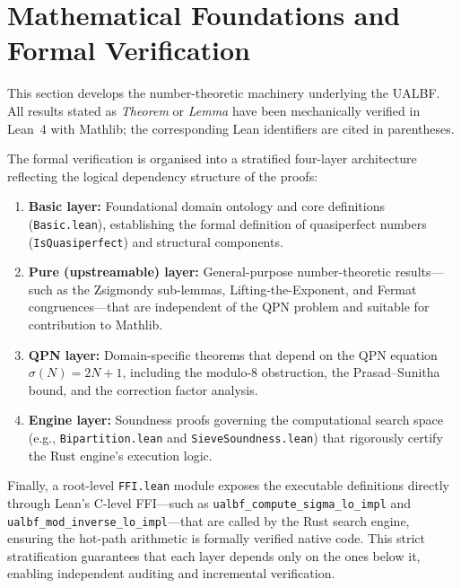 \section{Mathematical Foundations and Formal Verification}
\label{sec:math_foundations}

This section develops the number-theoretic machinery underlying the
UALBF\@.  All results stated as \emph{Theorem} or \emph{Lemma} have
been mechanically verified in Lean~4 with Mathlib; the corresponding
Lean identifiers are cited in parentheses.

The formal verification is organised into a stratified four-layer architecture
reflecting the logical dependency structure of the proofs:
\begin{enumerate}
  \item \textbf{Basic layer:}
    Foundational domain ontology and core definitions (\texttt{Basic.lean}),
    establishing the formal definition of quasiperfect numbers
    (\texttt{IsQuasiperfect}) and structural components.

  \item \textbf{Pure (upstreamable) layer:}
    General-purpose number-theoretic results---such as the Zsigmondy
    sub-lemmas, Lifting-the-Exponent, and Fermat congruences---that are
    independent of the QPN problem and suitable for contribution to
    Mathlib.

  \item \textbf{QPN layer:}
    Domain-specific theorems that depend on the QPN equation
    $\sigma(N) = 2N+1$, including the modulo-8 obstruction, the
    Prasad--Sunitha bound, and the correction factor analysis.

  \item \textbf{Engine layer:}
    Soundness proofs governing the computational search space (e.g.,
    \texttt{Bipartition.lean} and \texttt{SieveSoundness.lean}) that
    rigorously certify the Rust engine's execution logic.
\end{enumerate}
Finally, a root-level \texttt{FFI.lean} module exposes the executable definitions
directly through Lean's C-level FFI---such as
\texttt{ualbf\_\allowbreak{}compute\_\allowbreak{}sigma\_\allowbreak{}lo\_\allowbreak{}impl} and
\texttt{ualbf\_\allowbreak{}mod\_\allowbreak{}inverse\_\allowbreak{}lo\_\allowbreak{}impl}---that are
called by the Rust search engine, ensuring the hot-path arithmetic is
formally verified native code. This strict stratification guarantees that
each layer depends only on the ones below it, enabling independent auditing
and incremental verification.


